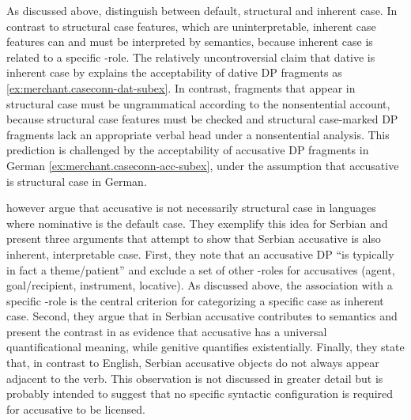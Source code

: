 As discussed above, \citet{progovac.etal2006} distinguish between default, structural and inherent case. In contrast to structural case features, which are uninterpretable, inherent case features can and must be interpreted by semantics, because inherent case is related to a specific \texttheta-role. The relatively uncontroversial claim that dative is inherent case by \citet[339]{progovac.etal2006} explains the acceptability of dative DP fragments as \ref{ex:merchant.caseconn-dat-subex}. In contrast, fragments that appear in structural case must be ungrammatical according to the nonsentential account, because structural case features must be checked and structural case-marked DP fragments lack an appropriate verbal head under a nonsentential analysis. This prediction is challenged by the acceptability of accusative DP fragments in German \ref{ex:merchant.caseconn-acc-subex}, under the assumption that accusative is structural case in German.

\citet{progovac.etal2006} however argue that accusative is not necessarily structural case in languages where nominative is the default case. They exemplify this idea for Serbian and present three arguments that attempt to show that Serbian accusative is also inherent, interpretable case. First, they note that an accusative DP ``is typically in fact a theme/patient'' \citep[339]{progovac.etal2006} and exclude a set of other \texttheta-roles for accusatives (agent, goal/recipient, instrument, locative). As discussed above, the association with a specific \texttheta-role is the central criterion for categorizing a specific case as inherent case. Second, they argue that in Serbian accusative contributes to semantics and present the contrast in \Next as evidence that accusative has a universal quantificational meaning, while genitive quantifies existentially. Finally, they state that, in contrast to English, Serbian accusative objects do not always appear adjacent to the verb. This observation is not discussed in greater detail but is probably intended to suggest that no specific syntactic configuration is required for accusative to be licensed.

